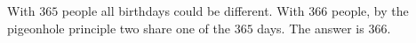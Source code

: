 With $365$ people all birthdays could be different. With $366$ people, by the pigeonhole principle two share one of the $365$ days. The answer is $\boxed{366}$.
